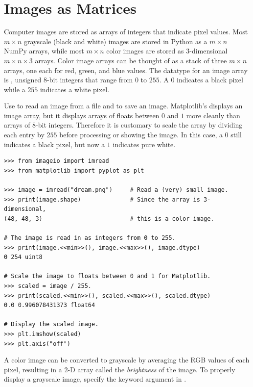 \section*{Images as Matrices} %

Computer images are stored as arrays of integers that indicate pixel values.
Most $m\times n$ grayscale (black and white) images are stored in Python as a $m\times n$ NumPy arrays, while most $m\times n$ color images are stored as $3$-dimensional $m\times n \times 3$ arrays.
Color image arrays can be thought of as a stack of three $m\times n$ arrays, one each for red, green, and blue values.
The datatype for an image array is , unsigned 8-bit integers that range from $0$ to $255$.
A $0$ indicates a black pixel while a $255$ indicates a white pixel.

Use  to read an image from a file and  to save an image.
Matplotlib's  displays an image array, but it displays arrays of floats between $0$ and $1$ more cleanly than arrays of 8-bit integers.
Therefore it is customary to scale the array by dividing each entry by $255$ before processing or showing the image.
In this case, a $0$ still indicates a black pixel, but now a $1$ indicates pure white.

\begin{lstlisting}
>>> from imageio import imread
>>> from matplotlib import pyplot as plt

>>> image = imread("dream.png")     # Read a (very) small image.
>>> print(image.shape)              # Since the array is 3-dimensional,
(48, 48, 3)                         # this is a color image.

# The image is read in as integers from 0 to 255.
>>> print(image.<<min>>(), image.<<max>>(), image.dtype)
0 254 uint8

# Scale the image to floats between 0 and 1 for Matplotlib.
>>> scaled = image / 255.
>>> print(scaled.<<min>>(), scaled.<<max>>(), scaled.dtype)
0.0 0.996078431373 float64

# Display the scaled image.
>>> plt.imshow(scaled)
>>> plt.axis("off")
\end{lstlisting}

A color image can be converted to grayscale by averaging the RGB values of each pixel, resulting in a 2-D array called the \emph{brightness} of the image.
To properly display a grayscale image, specify the keyword argument  in .

